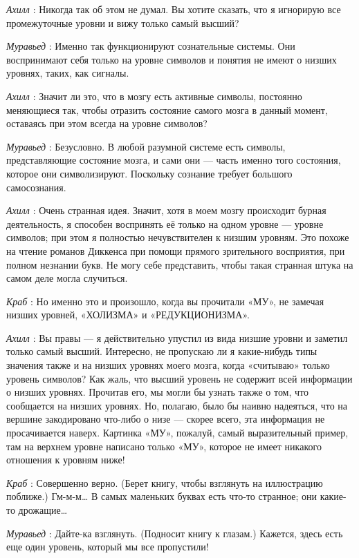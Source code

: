 \documentclass[../main.tex]{subfiles}
\begin{document}
\begin{dialogue}
\emph{Ахилл} : Никогда так об этом не думал. Вы хотите сказать, что я игнорирую все промежуточные уровни и вижу только самый высший?

\emph{Муравьед} : Именно так функционируют сознательные системы. Они воспринимают себя только на уровне символов и понятия не имеют о низших уровнях, таких, как сигналы.

\emph{Ахилл} : Значит ли это, что в мозгу есть активные символы, постоянно меняющиеся так, чтобы отразить состояние самого мозга в данный момент, оставаясь при этом всегда на уровне символов?

\emph{Муравьед} : Безусловно. В любой разумной системе есть символы, представляющие состояние мозга, и сами они --- часть именно того состояния, которое они символизируют. Поскольку сознание требует большого самосознания.

\emph{Ахилл} : Очень странная идея. Значит, хотя в моем мозгу происходит бурная деятельность, я способен воспринять её только на одном уровне --- уровне символов; при этом я полностью нечувствителен к низшим уровням. Это похоже на чтение романов Диккенса при помощи прямого зрительного восприятия, при полном незнании букв. Не могу себе представить, чтобы такая странная штука на самом деле могла случиться.

\emph{Краб} : Но именно это и произошло, когда вы прочитали «МУ», не замечая низших уровней, «ХОЛИЗМА» и «РЕДУКЦИОНИЗМА».

\emph{Ахилл} : Вы правы --- я действительно упустил из вида низшие уровни и заметил только самый высший. Интересно, не пропускаю ли я какие-нибудь типы значения также и на низших уровнях моего мозга, когда «считываю» только уровень символов? Как жаль, что высший уровень не содержит всей информации о низших уровнях. Прочитав его, мы могли бы узнать также о том, что сообщается на низших уровнях. Но, полагаю, было бы наивно надеяться, что на вершине закодировано что-либо о низе --- скорее всего, эта информация не просачивается наверх. Картинка «МУ», пожалуй, самый выразительный пример, там на верхнем уровне написано только «МУ», которое не имеет никакого отношения к уровням ниже!

\emph{Краб} : Совершенно верно. (Берет книгу, чтобы взглянуть на иллюстрацию поближе.) Гм-м-м\ldots{} В самых маленьких буквах есть что-то странное; они какие-то дрожащие\ldots{}

\emph{Муравьед} : Дайте-ка взглянуть. (Подносит книгу к глазам.) Кажется, здесь есть еще один уровень, который мы все пропустили!


\end{dialogue}
\end{document}
